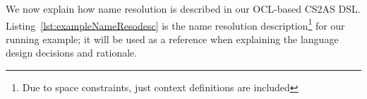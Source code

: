 \documentclass{llncs}
\begin{document}


We now explain how name resolution is described in our OCL-based CS2AS DSL. Listing~\ref{lst:exampleNameResodesc} is the name resolution description\footnote{Due to space constraints, just context definitions are included} for our running example; it will be used as a reference when explaining the language design decisions and rationale.
\end{document}
